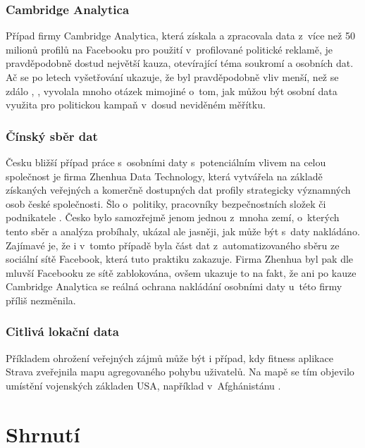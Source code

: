 \subsubsection*{Cambridge Analytica}
Případ firmy Cambridge Analytica, která získala a zpracovala data z~více než 50 milionů profilů na Facebooku \citep{cambridge-analytica} pro použití v~profilované politické reklamě, je pravděpodobně dostud největší kauza, otevírající téma soukromí a osobních dat. Ač se po letech vyšetřování ukazuje, že byl pravděpodobně vliv menší, než se zdálo \citep{ca-brexit}, \citep{ca-elections}, vyvolala mnoho otázek mimojiné o~tom, jak můžou být osobní data využita pro politickou kampaň v~dosud neviděném měřítku.

\subsubsection*{Čínský sběr dat}
Česku bližší případ práce s~osobními daty s~potenciálním vlivem na celou společnost je firma Zhenhua Data Technology, která vytvářela na základě získaných veřejných a komerčně dostupných dat profily strategicky významných osob české společnosti. Šlo o~politiky, pracovníky bezpečnostních složek či podnikatele \citep{china-czech}. Česko bylo samozřejmě jenom jednou z~mnoha zemí, o~kterých tento sběr a analýza probíhaly, ukázal ale jasněji, jak může být s~daty nakládáno.
Zajímavé je, že i v~tomto případě byla část dat z~automatizovaného sběru ze sociální sítě Facebook, která tuto praktiku zakazuje. Firma Zhenhua byl pak dle mluvší Facebooku ze sítě zablokována, ovšem ukazuje to na fakt, že ani po kauze Cambridge Analytica se reálná ochrana nakládání osobními daty u~této firmy příliš nezměnila.

\subsubsection*{Citlivá lokační data}
Příkladem ohrožení veřejných zájmů může být i případ, kdy fitness aplikace Strava zveřejnila mapu agregovaného pohybu uživatelů. Na mapě se tím objevilo umístění vojenských základen USA, například v~Afghánistánu \citep{strava-locations}. 

\section*{Shrnutí}
